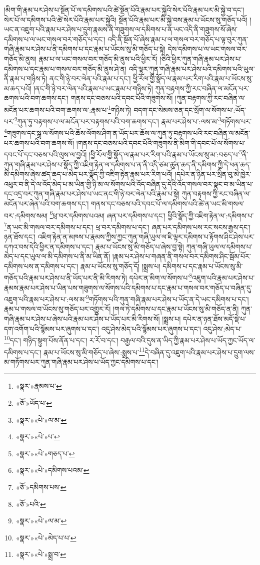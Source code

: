།མིག་གི་རྣམ་པར་ཤེས་པ་སྔོན་པོ་ལ་དམིགས་པའི་ཚེ་སྔོན་པོའི་རྣམ་པར་སྐྱེའི་སེར་པོའི་རྣམ་པར་མི་སྐྱེ་བ་དང་། སེར་པོ་ལ་དམིགས་པའི་ཚེ་སེར་པོའི་རྣམ་པར་སྐྱེའི། སྔོན་པོའི་རྣམ་པར་མི་སྐྱེ་བས་རྣམ་པ་ཡོངས་སུ་གཅོད་པའོ། །ཡང་ན་འཇུག་པའི་རྣམ་པར་ཤེས་པ་དྲུག་རྣམས་ནི་གཟུགས་ལ་དམིགས་པ་ན་ཡང་འདི་ནི་གཟུགས་སོ་ཞེས་དམིགས་པ་ལ་ཡང་གསལ་བར་གཅོད་པ་དང་། འདི་ནི་སྔོན་པོ་ཞེས་རྣམ་པ་ལ་གསལ་བར་གཅོད་པ་ལྟ་བུར་ཀུན་གཞི་རྣམ་པར་ཤེས་པ་ནི་དམིགས་པ་དང་རྣམ་པ་ཡོངས་སུ་མི་གཅོད་པ་སྟེ། དེས་དམིགས་པ་ལ་ཡང་གསལ་བར་གཅོད་མི་ནུས། རྣམ་པ་ལ་ཡང་གསལ་བར་གཅོད་མི་ནུས་པའི་ཕྱིར་རོ། །ཅིའི་ཕྱིར་ཀུན་གཞི་རྣམ་པར་ཤེས་པ་དམིགས་པ་དང་རྣམ་པ་གསལ་བར་གཅོད་མི་ནུས་ཤེ་ན། འདི་ལྟར་ཀུན་གཞི་རྣམ་པར་ཤེས་པའི་དམིགས་པའི་ཡུལ་ནི་རྣམ་པ་གཉིས་ཏེ། ནང་གི་ཉེ་བར་ལེན་པའི་རྣམ་པ་དང་། ཕྱི་རོལ་གྱི་སྣོད་ལ་རྣམ་པར་རིག་པའི་རྣམ་པ་ཡོངས་སུ་མ་ཆད་པའོ། །ནང་གི་ཉེ་བར་ལེན་པའི་རྣམ་པ་ཡང་རྣམ་པ་གཉིས་ཏེ། ཀུན་བརྟགས་ཀྱི་རང་བཞིན་ལ་མངོན་པར་ཆགས་པའི་བག་ཆགས་དང་། གནས་དང་བཅས་པའི་དབང་པོའི་གཟུགས་སོ། །ཀུན་བརྟགས་ཀྱི་རང་བཞིན་ལ་མངོན་པར་ཆགས་པའི་བག་ཆགས་ལ་:རྣམ་པ་\footnote{«སྣར་»རྣམས་པ་}གཉིས་ཏེ། བདག་དང་སེམས་ཅན་དང་སྲོག་ལ་སོགས་པ་:ཡོད་པར་\footnote{«ཅོ་»ཡོད་པ་}ཀུན་ཏུ་བརྟགས་པ་ལ་མངོན་པར་བརྟགས་པའི་བག་ཆགས་དང་། རྣམ་པར་ཤེས་པ་:ལས་མ་\footnote{«སྣར་»«པེ་»ལ་མ་}གཏོགས་པར་\footnote{«སྣར་»«པེ་»པ་}གཟུགས་དང་སྒྲ་ལ་སོགས་པའི་ཆོས་ལོགས་ཤིག་ན་ཡོད་པར་ཆོས་ལ་ཀུན་ཏུ་བརྟགས་པའི་རང་བཞིན་ལ་མངོན་པར་ཆགས་པའི་བག་ཆགས་སོ། །གནས་དང་བཅས་པའི་དབང་པོའི་གཟུགས་ནི་མིག་གི་དབང་པོ་ལ་སོགས་པ་དབང་པོ་དང་བཅས་པའི་ལུས་ལ་བྱའོ། །ཕྱི་རོལ་གྱི་སྣོད་ལ་རྣམ་པར་རིག་པའི་རྣམ་པ་ཡོངས་སུ་མ་:བཅད་པ་\footnote{«སྣར་»«པེ་»གཅད་པ་}ནི་ཀུན་གཞི་རྣམ་པར་ཤེས་པ་སྣོད་ཀྱི་འཇིག་རྟེན་ལ་དམིགས་པ་ན་ནི་འདི་ཙམ་ཚུན་ཆད་ནི་དམིགས་ཀྱི་དེ་ཕན་ཆད་མི་དམིགས་ཞེས་ཚད་ཆད་པ་མེད་པར་སྣོད་ཀྱི་འཇིག་རྟེན་རྣམ་པར་རིག་པའོ། །དཔེར་ན་ཉིན་པར་སྲིན་བུ་མེ་ཁྱེར་འཕུར་བ་ནི་དེ་ལ་འོད་མེད་པ་མ་ཡིན་གྱི་ཉི་མ་ལ་སོགས་པའི་འོད་བཞིན་དུ་དེའི་འོད་གསལ་བར་སྣང་བ་མ་ཡིན་པ་དང་འདྲ་བར་ཀུན་གཞི་རྣམ་པར་ཤེས་པ་ཡང་ནང་གི་ཉེ་བར་ལེན་པའི་རྣམ་པ་སྟེ། ཀུན་བརྟགས་ཀྱི་རང་བཞིན་ལ་མངོན་པར་ཞེན་པའི་བག་ཆགས་དང་། གནས་དང་བཅས་པའི་དབང་པོ་ལ་དམིགས་པའི་ཚེ་ན་ཡང་མི་གསལ་བར་:དམིགས་སམ། \footnote{«སྣར་»«པེ་»དམིགས་པའམ་}ཕྲ་བར་དམིགས་པའམ། ཞན་པར་དམིགས་པ་དང་། ཕྱིའི་སྣོད་ཀྱི་འཇིག་རྟེན་ལ་:དམིགས་པ་\footnote{«ཅོ་»དམིགས་པས་}ན་ཡང་མི་གསལ་བར་དམིགས་པ་དང་། ཕྲ་བར་དམིགས་པ་དང་། ཞན་པར་དམིགས་པས་རང་སངས་རྒྱས་དང་། ཉན་ཐོས་དང་། འཇིག་རྟེན་ན་མཁས་པ་རྣམས་ཀྱིས་ཀྱང་ཀུན་གཞི་ཡུལ་ལ་ཇི་ལྟར་དམིགས་པ་རྟོགས་ཤིང་ཤེས་པར་དཀའ་བས་དེའི་ཕྱིར་ན་དམིགས་པ་དང་། རྣམ་པ་ཡོངས་སུ་མི་གཅོད་པ་ཞེས་བྱ་སྟེ། ཀུན་གཞི་ཡུལ་ལ་དམིགས་པ་མེད་པ་དང་ཡུལ་ལ་མི་དམིགས་པ་ནི་མ་ཡིན་ནོ། །རྣམ་པར་ཤེས་པ་གཞན་ནི་གསལ་བར་དམིགས་ཤིང་སྦོམ་པོར་དམིགས་པས་ན་དམིགས་པ་དང་། རྣམ་པ་ཡོངས་སུ་གཅོད་དོ། །སྨྲས་པ། དམིགས་པ་དང་རྣམ་པ་ཡོངས་སུ་མི་གཅོད་པའི་རྣམ་པར་ཤེས་པ་ནི་ཡོད་པར་ནི་མི་རིགས་ཏེ། དཔེར་ན་མིག་ལ་སོགས་པ་\footnote{«ཅོ་»པའི་}འཇུག་པའི་རྣམ་པར་ཤེས་པ་རྣམས་རྣམ་པར་ཤེས་པ་ཡིན་པས་གཟུགས་ལ་སོགས་པའི་དམིགས་པ་དང་རྣམ་པ་གསལ་བར་གཅོད་པ་བཞིན་དུ་འཇུག་པའི་རྣམ་པར་ཤེས་པ་:ལས་མ་\footnote{«སྣར་»«པེ་»ལ་མ་}གཏོགས་པའི་ཀུན་གཞི་རྣམ་པར་ཤེས་པ་ཡོད་ན་དེ་ཡང་དམིགས་པ་དང་། རྣམ་པ་གསལ་བ་ཡོངས་སུ་གཅོད་པར་འགྱུར་རོ། །གལ་ཏེ་དམིགས་པ་དང་རྣམ་པ་ཡོངས་སུ་མི་གཅོད་ན་ནི། ཀུན་གཞི་རྣམ་པར་ཤེས་པ་ཞེས་པའི་རྣམ་པར་ཤེས་པ་ཡོད་པར་མི་རིགས་སོ། །སྨྲས་པ། དཔེར་ན་ཉན་ཐོས་མདོ་སྡེ་པ་དག་འགོག་པའི་སྙོམས་པར་ཞུགས་པ་དང་། འདུ་ཤེས་མེད་པའི་སྙོམས་པར་ཞུགས་པ་དང་། འདུ་ཤེས་:མེད་པ་\footnote{«སྣར་»«པེ་»མེད་པ་པ་}དང་། གཉིད་སྟུག་པོས་ནོན་པ་དང་། ར་རོ་བ་དང་། བརྒྱལ་བའི་དུས་ན་ཡིད་ཀྱི་རྣམ་པར་ཤེས་པ་ཡོད་ཀྱང་ཡོད་ལ་དམིགས་པ་དང་། རྣམ་པ་ཡོངས་སུ་མི་གཅོད་པ་ཞེས་:སྨྲས་པ་\footnote{«སྣར་»«པེ་»སྨྲ་བ་}དེ་བཞིན་དུ་འཇུག་པའི་རྣམ་པར་ཤེས་པ་དྲུག་ལས་མ་གཏོགས་པར་ཀུན་གཞི་རྣམ་པར་ཤེས་པ་ཡོད་ཀྱང་དམིགས་པ་དང་། 